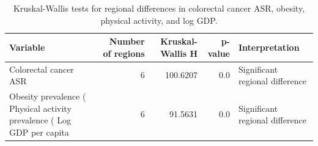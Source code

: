 \begin{table}
\centering
\caption{Kruskal-Wallis tests for regional differences in colorectal cancer ASR, obesity, physical activity, and log GDP.}
\label{tab:kruskal_wallis_tests}
\begin{tabular}{lrrrl}
\toprule
                        Variable &  Number of regions &  Kruskal-Wallis H &  p-value &                  Interpretation \\
\midrule
           Colorectal cancer ASR &                  6 &          100.6207 &      0.0 & Significant regional difference \\
          Obesity prevalence (%
Physical activity prevalence (%
              Log GDP per capita &                  6 &           91.5631 &      0.0 & Significant regional difference \\
\bottomrule
\end{tabular}
\end{table}
